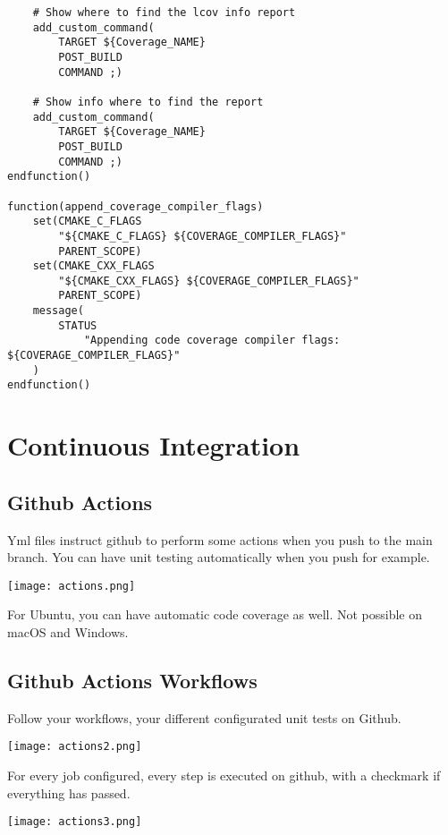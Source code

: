 \documentclass[openany]{report}
\begin{document}
\begin{verbatim}
    # Show where to find the lcov info report
    add_custom_command(
        TARGET ${Coverage_NAME}
        POST_BUILD
        COMMAND ;)

    # Show info where to find the report
    add_custom_command(
        TARGET ${Coverage_NAME}
        POST_BUILD
        COMMAND ;)
endfunction()

function(append_coverage_compiler_flags)
    set(CMAKE_C_FLAGS
        "${CMAKE_C_FLAGS} ${COVERAGE_COMPILER_FLAGS}"
        PARENT_SCOPE)
    set(CMAKE_CXX_FLAGS
        "${CMAKE_CXX_FLAGS} ${COVERAGE_COMPILER_FLAGS}"
        PARENT_SCOPE)
    message(
        STATUS
            "Appending code coverage compiler flags: ${COVERAGE_COMPILER_FLAGS}"
    )
endfunction()
\end{verbatim}


\section{Continuous Integration}


\subsection{Github Actions}

Yml files instruct github to perform some actions when you push to the main branch. 
You can have unit testing automatically when you push for example.


\begin{center}
    \texttt{[image: actions.png]}
\end{center}

For Ubuntu, you can have automatic code coverage as well. Not possible on macOS and Windows.


\subsection{Github Actions Workflows}

Follow your workflows, your different configurated unit tests on Github.


\begin{center}
    \texttt{[image: actions2.png]}
\end{center}

For every job configured, every step is executed on github, with a checkmark if everything has passed.


\begin{center}
    \texttt{[image: actions3.png]}
\end{center}
\end{document}
